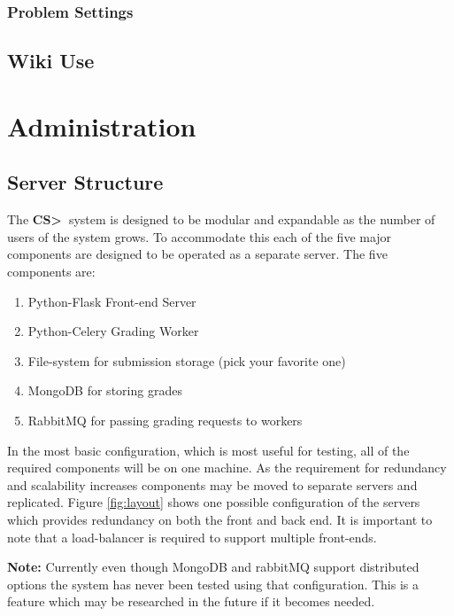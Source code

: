 \documentclass[11pt]{report}
\newcommand{\csgt}[0]{\textbf{CS\textgreater\ }}
\begin{document}
\subsection{Problem Settings}




\section{Wiki Use}
\label{sec:wiki}


\chapter{Administration}
\label{ch:admin}
\section{Server Structure}
The \csgt system is designed to be modular and expandable as the number of users of the system grows.
To accommodate this each of the five major components are designed to be operated as a separate server.
The five components are:

\begin{enumerate}
\item Python-Flask Front-end Server
\item Python-Celery Grading Worker
\item File-system for submission storage (pick your favorite one)
\item MongoDB for storing grades
\item RabbitMQ for passing grading requests to workers
\end{enumerate}

In the most basic configuration, which is most useful for testing, all of the required components will be
on one machine. As the requirement for redundancy and scalability increases components may be moved to
separate servers and replicated. Figure \ref{fig:layout} shows one possible configuration of the servers
which provides redundancy on both the front and back end. It is important to note that a load-balancer is
required to support multiple front-ends.

\textbf{Note:} Currently even though MongoDB and rabbitMQ support distributed options the system has never
been tested using that configuration. This is a feature which may be researched in the future if it becomes
needed.
\end{document}
